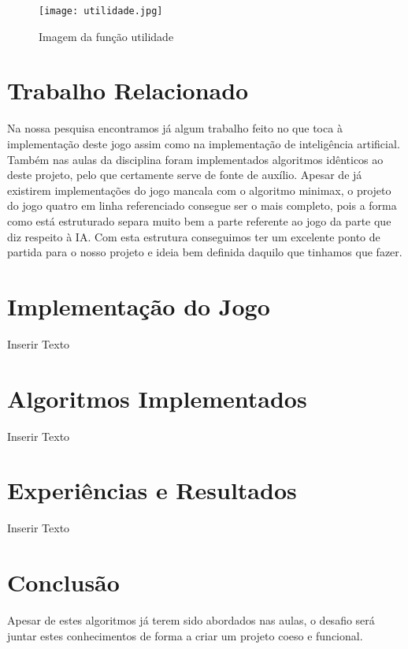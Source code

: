 \documentclass[conference]{IEEEtran}
\begin{document}
\begin{figure}[htbp]
    \centerline{\texttt{[image: utilidade.jpg]}}
    \caption{Imagem da função utilidade}
    \label{img6}
\end{figure}

\section{Trabalho Relacionado}

Na nossa pesquisa encontramos j\'a algum trabalho feito no que toca \`a implementa\c c\~ao deste jogo assim como na implementa\c c\~ao de intelig\^encia artificial\cite{b2}\cite{b3}\cite{b9}.
Tamb\'em nas aulas da disciplina foram implementados algoritmos id\^enticos ao deste projeto, pelo que certamente serve de fonte de auxílio.
Apesar de já existirem implementações do jogo mancala com o algoritmo minimax, o projeto do jogo quatro em linha referenciado consegue ser o mais completo, pois a forma como está estruturado separa muito bem a parte referente ao jogo da parte que diz respeito à IA.
Com esta estrutura conseguimos ter um excelente ponto de partida para o nosso projeto e ideia bem definida daquilo que tinhamos que fazer.

\section{Implementa\c c\~ao do Jogo}
Inserir Texto

\section{Algoritmos Implementados}
Inserir Texto

\section{Experiências e Resultados}
Inserir Texto

\section{Conclus\~ao}

Apesar de estes algoritmos j\'a terem sido abordados nas aulas, o desafio ser\'a juntar estes conhecimentos de forma a criar um projeto coeso e funcional.

\end{document}
